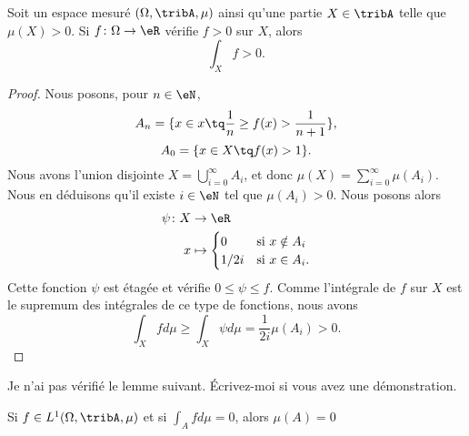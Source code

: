 \begin{lemma}		\label{LEMooLXVGooUDuQzc}
	Soit un espace mesuré \( (\Omega,\tribA, \mu)\) ainsi qu'une partie \( X\in\tribA\) telle que \( \mu(X)>0\). Si \(f \colon \Omega\to \eR  \) vérifie \( f>0\) sur \( X\), alors
	\begin{equation}
		\int_Xf>0.
	\end{equation}
\end{lemma}

\begin{proof}
	Nous posons, pour \( n\in \eN\),
	\begin{equation}
		A_n=\{ x\in x\tq \frac{1}{ n}\geq f(x)>\frac{1}{ n+1} \},
	\end{equation}
	\begin{equation}
		A_0=\{ x\in X\tq f(x)>1 \}.
	\end{equation}
	Nous avons l'union disjointe \( X=\bigcup_{i=0}^{\infty}A_i\), et donc \( \mu(X)=\sum_{i=0}^{\infty}\mu(A_i)\). Nous en déduisons qu'il existe \( i\in \eN\) tel que \( \mu(A_i)>0\). Nous posons alors
	\begin{equation}
		\begin{aligned}
			\psi\colon X & \to \eR                               \\
			x            & \mapsto \begin{cases}
				                       0    & \text{si } x\notin A_i \\
				                       1/2i & \text{si }x\in A_i.
			                       \end{cases}
		\end{aligned}
	\end{equation}
	Cette fonction \( \psi\) est étagée et vérifie \( 0\leq \psi\leq f\). Comme l'intégrale de \( f\) sur \( X\) est le supremum des intégrales de ce type de fonctions, nous avons
	\begin{equation}
		\int_Xfd\mu\geq \int_X\psi d\mu=\frac{1}{ 2i}\mu(A_i)>0.
	\end{equation}
\end{proof}

\begin{probleme}
	Je n'ai pas vérifié le lemme suivant. Écrivez-moi si vous avez une démonstration.
\end{probleme}

\begin{lemma}		\label{LEMooVZXFooZAQWKY}
	Si \( f\in L^1(\Omega,\tribA, \mu)\) et si \( \int_Afd\mu=0\), alors \( \mu(A)=0\)
\end{lemma}

